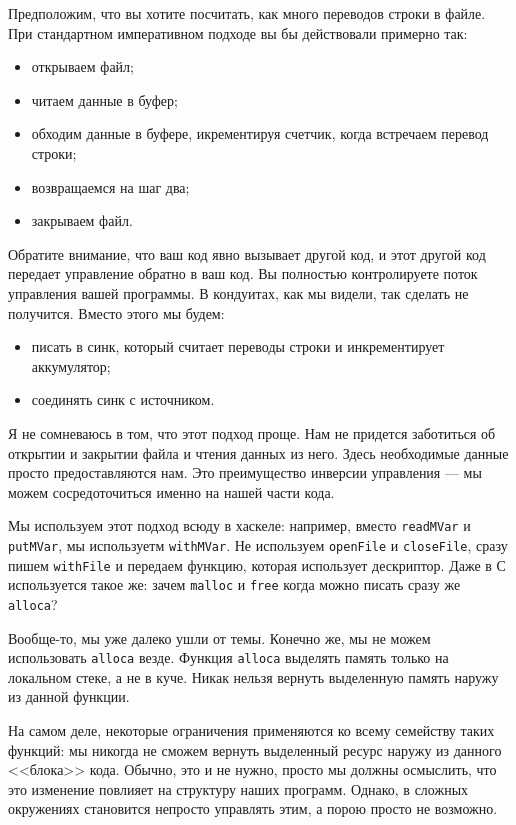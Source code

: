 Предположим, что вы хотите посчитать, как много переводов строки в файле. При 
стандартном императивном подходе вы бы действовали примерно так:
\begin{itemize}  
\item   открываем файл;
\item   читаем данные в буфер;
\item   обходим данные в буфере, икрементируя счетчик, когда встречаем перевод строки;
\item   возвращаемся на шаг два;
\item   закрываем файл.
\end{itemize}
Обратите внимание, что ваш код явно вызывает другой код, и этот другой код 
передает управление обратно в ваш код. Вы полностью контролируете поток 
управления вашей программы. В кондуитах, как мы видели, так сделать 
не получится. Вместо этого мы будем:
\begin{itemize}
\item  писать в синк, который считает переводы строки и инкрементирует  аккумулятор;
\item  соединять синк с источником.
\end{itemize} 
Я не сомневаюсь в том, что этот подход проще. Нам не придется заботиться об 
открытии и закрытии файла и чтения данных из него. Здесь необходимые данные 
просто предоставляются нам. Это преимущество инверсии управления --- мы 
можем сосредоточиться именно на нашей части кода.

Мы используем этот подход всюду в хаскеле: например, вместо \lstinline'readMVar' 
и \lstinline'putMVar', мы используетм \lstinline'withMVar'. Не используем 
\lstinline'openFile' и \lstinline'closeFile', сразу пишем \lstinline'withFile' 
и передаем функцию, которая использует дескриптор. Даже в С используется такое 
же: зачем \lstinline'malloc' и \lstinline'free' когда можно писать сразу же
\lstinline'alloca'?

Вообще-то, мы уже далеко ушли от темы. Конечно же, мы не можем использовать 
\lstinline'alloca' везде. Функция \lstinline'alloca' выделять память только на 
локальном стеке, а не в куче. Никак нельзя вернуть выделенную память наружу из 
данной функции.

На самом деле, некоторые ограничения применяются ко всему семейству таких 
функций: мы никогда не сможем вернуть выделенный ресурс наружу из данного 
<<блока>> кода. Обычно, это и не нужно, просто мы должны осмыслить, что это 
изменение повлияет на структуру наших программ. Однако, в сложных окружениях 
становится непросто управлять этим, а порою просто не возможно. 

